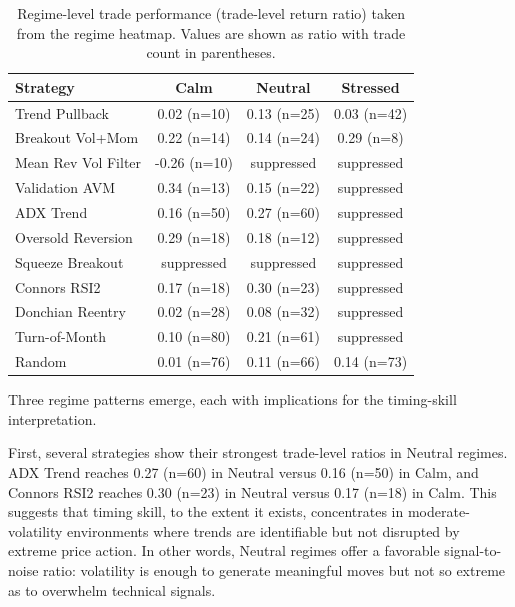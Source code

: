 \documentclass[preprint,12pt]{elsarticle}
\theoremstyle{definition}
\begin{document}
\begin{table}[htbp]
\centering
\caption{Regime-level trade performance (trade-level return ratio) taken from the regime heatmap. Values are shown as ratio with trade count in parentheses.}
\label{tab:regimes}
\small
\renewcommand{\arraystretch}{1.1}
\begin{tabular}{lccc}
\toprule
Strategy & Calm & Neutral & Stressed \\
\midrule
Trend Pullback      & 0.02 (n=10) & 0.13 (n=25) & 0.03 (n=42) \\
Breakout Vol+Mom    & 0.22 (n=14) & 0.14 (n=24) & 0.29 (n=8) \\
Mean Rev Vol Filter & -0.26 (n=10) & suppressed & suppressed \\
Validation AVM      & 0.34 (n=13) & 0.15 (n=22) & suppressed \\
ADX Trend           & 0.16 (n=50) & 0.27 (n=60) & suppressed \\
Oversold Reversion  & 0.29 (n=18) & 0.18 (n=12) & suppressed \\
Squeeze Breakout    & suppressed & suppressed & suppressed \\
Connors RSI2        & 0.17 (n=18) & 0.30 (n=23) & suppressed \\
Donchian Reentry    & 0.02 (n=28) & 0.08 (n=32) & suppressed \\
Turn-of-Month       & 0.10 (n=80) & 0.21 (n=61) & suppressed \\
Random              & 0.01 (n=76) & 0.11 (n=66) & 0.14 (n=73) \\
\bottomrule
\end{tabular}
\end{table}

Three regime patterns emerge, each with implications for the timing-skill interpretation.

First, several strategies show their strongest trade-level ratios in Neutral regimes. ADX Trend reaches 0.27 (n=60) in Neutral versus 0.16 (n=50) in Calm, and Connors RSI2 reaches 0.30 (n=23) in Neutral versus 0.17 (n=18) in Calm. This suggests that timing skill, to the extent it exists, concentrates in moderate-volatility environments where trends are identifiable but not disrupted by extreme price action. In other words, Neutral regimes offer a favorable signal-to-noise ratio: volatility is enough to generate meaningful moves but not so extreme as to overwhelm technical signals.
\end{document}
